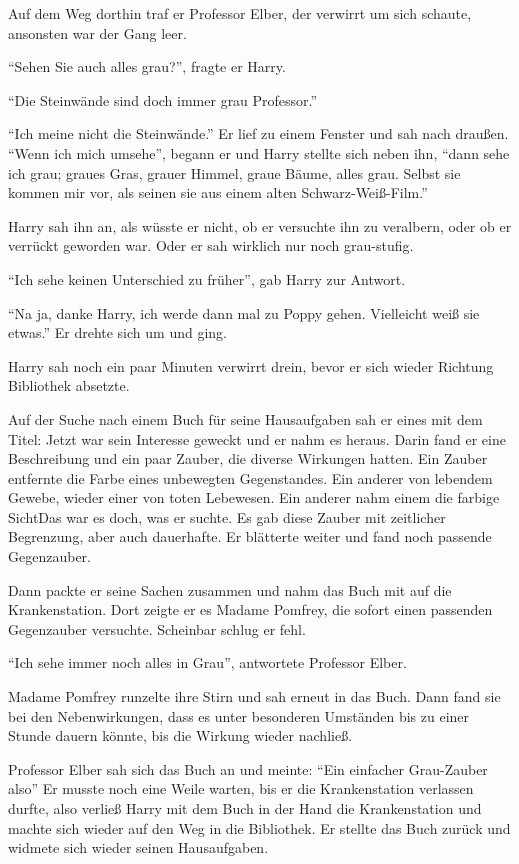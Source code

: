 Auf dem Weg dorthin traf er Professor Elber, der verwirrt um sich schaute, ansonsten war der Gang leer.

\enquote{Sehen Sie auch alles grau?}, fragte er Harry.

\enquote{Die Steinwände sind doch immer grau Professor.}

\enquote{Ich meine nicht die Steinwände.} Er lief zu einem Fenster und sah nach draußen. \enquote{Wenn ich mich umsehe}, begann er und Harry stellte sich neben ihn, \enquote{dann sehe ich grau; graues Gras, grauer Himmel, graue Bäume, alles grau. Selbst sie kommen mir vor, als seinen sie aus einem alten Schwarz-Weiß-Film.}

Harry sah ihn an, als wüsste er nicht, ob er versuchte ihn zu veralbern, oder ob er verrückt geworden war. Oder er sah wirklich nur noch grau-stufig.

\enquote{Ich sehe keinen Unterschied zu früher}, gab Harry zur Antwort.

\enquote{Na ja, danke Harry, ich werde dann mal zu Poppy gehen. Vielleicht weiß sie etwas.} Er drehte sich um und ging.

Harry sah noch ein paar Minuten verwirrt drein, bevor er sich wieder Richtung Bibliothek absetzte.

Auf der Suche nach einem Buch für seine Hausaufgaben sah er eines mit dem Titel:  Jetzt war sein Interesse geweckt und er nahm es heraus. Darin fand er eine Beschreibung und ein paar Zauber, die diverse Wirkungen hatten. Ein Zauber entfernte die Farbe eines unbewegten Gegenstandes. Ein anderer von lebendem Gewebe, wieder einer von toten Lebewesen. Ein anderer nahm einem die farbige Sicht\abs Das war es doch, was er suchte. Es gab diese Zauber mit zeitlicher Begrenzung, aber auch dauerhafte. Er blätterte weiter und fand noch passende Gegenzauber.

Dann packte er seine Sachen zusammen und nahm das Buch mit auf die Krankenstation. Dort zeigte er es Madame Pomfrey, die sofort einen passenden Gegenzauber versuchte. Scheinbar schlug er fehl.

\enquote{Ich sehe immer noch alles in Grau}, antwortete Professor Elber.

Madame Pomfrey runzelte ihre Stirn und sah erneut in das Buch. Dann fand sie bei den Nebenwirkungen, dass es unter besonderen Umständen bis zu einer Stunde dauern könnte, bis die Wirkung wieder nachließ.

Professor Elber sah sich das Buch an und meinte: \enquote{Ein einfacher Grau-Zauber also\abs} Er musste noch eine Weile warten, bis er die Krankenstation verlassen durfte, also verließ Harry mit dem Buch in der Hand die Krankenstation und machte sich wieder auf den Weg in die Bibliothek. Er stellte das Buch zurück und widmete sich wieder seinen Hausaufgaben.




